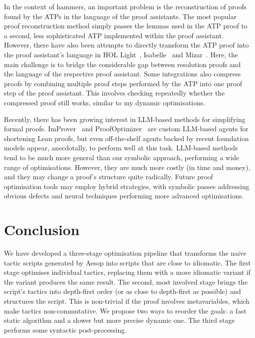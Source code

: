 In the context of hammers, an important problem is the reconstruction of proofs found by the ATPs in the language of the proof assistants.
The most popular proof reconstruction method simply passes the lemmas used in the ATP proof to a second, less sophisticated ATP implemented within the proof assistant.
However, there have also been attempts to directly transform the ATP proof into the proof assistant's language in HOL Light~\cite{PRocH}, Isabelle~\cite{MetisIsabelle,Blanchette2013a,Blanchette2013b,Blanchette2016} and Mizar~\cite{ATPMizar,MizarATP}.
Here, the main challenge is to bridge the considerable gap between resolution proofs and the language of the respective proof assistant.
Some integrations also compress proofs by combining multiple proof steps performed by the ATP into one proof step of the proof assistant.
This involves checking repeatedly whether the compressed proof still works, similar to my dynamic optimisations.

Recently, there has been growing interest in LLM-based methods for simplifying formal proofs.
ImProver~\cite{ImProver} and ProofOptimizer~\cite{ProofOptimizer} are custom LLM-based agents for shortening Lean proofs, but even off-the-shelf agents backed by recent foundation models appear, anecdotally, to perform well at this task.
LLM-based methods tend to be much more general than our symbolic approach, performing a wide range of optimisations.
However, they are much more costly (in time and money), and they may change a proof's structure quite radically.
Future proof optimisation tools may employ hybrid strategies, with symbolic passes addressing obvious defects and neural techniques performing more advanced optimisations.

\section{Conclusion}%
\label{sec:script:concl}

We have developed a three-stage optimisation pipeline that transforms the naive tactic scripts generated by Aesop into scripts that are close to idiomatic.
The first stage optimises individual tactics, replacing them with a more idiomatic variant if the variant produces the same result.
The second, most involved stage brings the script's tactics into depth-first order (or as close to depth-first as possible) and structures the script.
This is non-trivial if the proof involves metavariables, which make tactics non-commutative.
We propose two ways to reorder the goals: a fast static algorithm and a slower but more precise dynamic one.
The third stage performs some syntactic post-processing.

